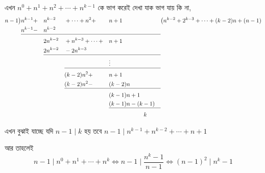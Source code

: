 \documentclass[a4paper,11pt]{article}
\begin{document}
এখন $n^0+n^1+n^2+\cdots+n^{k-1}$ কে ভাগ করেই দেখা যাক ভাগ যায় কি না, 
\renewcommand\arraystretch{1.2}
\begin{alignat*}{6}
	n-1 \big) & n^{k-1}+ &  & n^{k-2}  &  & +\cdots+n^2+     &  & n+1                    &  & \big(n^{k-2}+2^{k-3}+\cdots+(k-2)n+(n-1) \\
	          & n^{k-1}- &  & n^{k-2}  &  &                  &  &                                                                      \\[-2.5ex]
	\cline{2-9}
	          &          &  & 2n^{k-2} &  & +n^{k-3}+\cdots+ &  & n+1                    &  &                                          \\
	          &          &  & 2n^{k-2} &  & -2n^{k-3}        &  &                        &  &                                          \\[-2.5ex]
	\cline{4-9}
	          &          &  &          &  &                  &  & \vdots                 &  &                                          \\[-2.5ex]
	\cline{5-9}
	          &          &  &          &  & (k-2)n^2+        &  & n+1                    &  &                                          \\
	          &          &  &          &  & (k-2)n^2-        &  & (k-2)n                 &  &                                          \\[-2.5ex]
	\cline{5-9}
	          &          &  &          &  &                  &  & (k-1)n+1               &  &                                          \\
	          &          &  &          &  &                  &  & (k-1)n-(k-1)           &  &                                          \\[-2.5ex]
	\cline{7-9}
	          &          &  &          &  &                  &  & \qquad \qquad \qquad k &  & 
\end{alignat*}

এখন বুঝাই যাচ্ছে যদি $n-1 \mid k$ হয় তবে $n-1 \mid n^{k-1}+n^{k-2}+\cdots+n+1$

আর তাহলেই \[n-1 \mid n^0+n^1+\cdots+n^k \iff n-1 \mid \dfrac{n^k-1}{n-1} \iff (n-1)^2 \mid n^k-1\]
\end{document}
